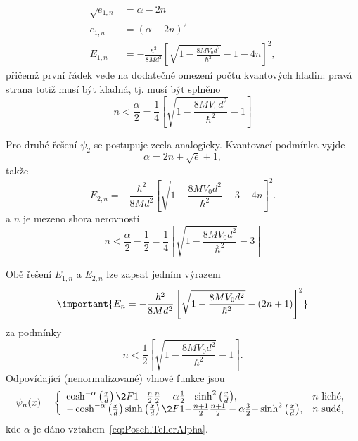 \begin{solution}
\begin{enumerate}
        \begin{align}
            \sqrt{e_{1,n}}&=\alpha-2n\nonumber\\
            e_{1,n}&=\left(\alpha-2n\right)^{2}\nonumber\\
            E_{1,n}&=-\frac{\hbar^{2}}{8Md^{2}}\left[\sqrt{1-\frac{8MV_{0}d^{2}}{\hbar^{2}}}-1-4n\right]^{2},
        \end{align}
        přičemž první řádek vede na dodatečné omezení počtu kvantových hladin: pravá strana totiž musí být kladná, tj. musí být splněno
        \begin{equation}
            n<\frac{\alpha}{2}=\frac{1}{4}\left[\sqrt{1-\frac{8MV_{0}d^{2}}{\hbar^{2}}}-1\right]
        \end{equation}

        Pro druhé řešení $\psi_{2}$ se postupuje zcela analogicky.
        Kvantovací podmínka vyjde
        \begin{equation}
            \alpha=2n+\sqrt{e}+1,
        \end{equation}
        takže
        \begin{equation}
            E_{2,n}=-\frac{\hbar^{2}}{8Md^{2}}\left[\sqrt{1-\frac{8MV_{0}d^{2}}{\hbar^{2}}}-3-4n\right]^{2}.
        \end{equation}
        a $n$ je mezeno shora nerovností
        \begin{equation}
            n<\frac{\alpha}{2}-\frac{1}{2}=\frac{1}{4}\left[\sqrt{1-\frac{8MV_{0}d^{2}}{\hbar^{2}}}-3\right]
        \end{equation}

        Obě řešení $E_{1,n}$ a $E_{2,n}$ lze zapsat jedním výrazem
        \begin{equation}
            \important{E_{n}=-\frac{\hbar^{2}}{8Md^{2}}\left[\sqrt{1-\frac{8MV_{0}d^{2}}{\hbar^{2}}}-(2n+1)\right]^{2}}
        \end{equation}
        za podmínky
        \begin{equation}
            n<\frac{1}{2}\left[\sqrt{1-\frac{8MV_{0}d^{2}}{\hbar^{2}}}-1\right].
        \end{equation}
        Odpovídající (nenormalizované) vlnové funkce jsou
        \begin{equation}
            \psi_{n}(x)=\left\{
                \begin{array}{ll}
                    \cosh^{-\alpha}\left(\frac{x}{d}\right)\2F1{-\frac{n}{2}}{\frac{n}{2}-\alpha}{\frac{1}{2}}{-\sinh^{2}\left(\frac{x}{d}\right)}, & n\ \text{liché,}\\           
                    -\cosh^{-\alpha}\left(\frac{x}{d}\right)\sinh\left(\frac{x}{d}\right)\2F1{-\frac{n+1}{2}}{\frac{n+1}{2}-\alpha}{\frac{3}{2}}{-\sinh^{2}\left(\frac{x}{d}\right)},& n\ \text{sudé,}
                \end{array}\right.
        \end{equation}
        kde $\alpha$ je dáno vztahem~\eqref{eq:PoschlTellerAlpha}.


\end{enumerate}
\end{solution}
